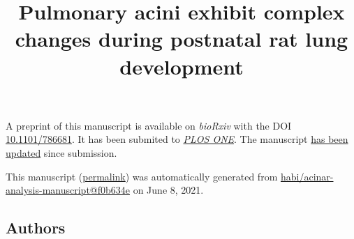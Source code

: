 \documentclass[
  american,
]{article}
\title{Pulmonary acini exhibit complex changes during postnatal rat lung development}
\author{}
\date{}
\begin{document}
\maketitle

A preprint of this manuscript is available on \emph{bioRxiv} with the DOI \href{https://doi.org/10.1101/786681}{10.1101/786681}.
It has been submited to \href{https://journals.plos.org/plosone/}{\emph{PLOS ONE}}.
The manuscript \href{https://github.com/habi/acinar-analysis-manuscript/compare/5e778036e316c47b8bac4ce50086b191a7e3707a...f0b634e60b036c18080d89c63034379371acaf83}{has been updated} since submission.

This manuscript
(\href{https://habi.github.io/acinar-analysis-manuscript/v/f0b634e60b036c18080d89c63034379371acaf83/}{permalink})
was automatically generated
from \href{https://github.com/habi/acinar-analysis-manuscript/tree/f0b634e60b036c18080d89c63034379371acaf83}{habi/acinar-analysis-manuscript@f0b634e}
on June 8, 2021.

\hypertarget{authors}{%
\subsection{Authors}\label{authors}}
\end{document}
